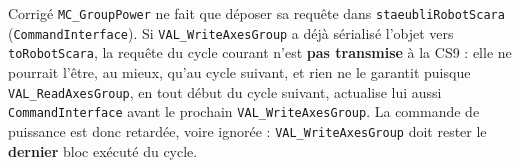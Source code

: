 \begin{UPSTIactivite}

\begin{UPSTIcorrectionP}{Corrigé}
\texttt{MC\_GroupPower} ne fait que déposer sa requête dans
\texttt{staeubliRobotScara} (\texttt{CommandInterface}). Si
\texttt{VAL\_WriteAxesGroup} a déjà sérialisé l'objet vers
\texttt{toRobotScara}, la requête du cycle courant n'est \textbf{pas
transmise} à la CS9 : elle ne pourrait l'être, au mieux, qu'au cycle
suivant, et rien ne le garantit puisque \texttt{VAL\_ReadAxesGroup}, en
tout début du cycle suivant, actualise lui aussi \texttt{CommandInterface}
avant le prochain \texttt{VAL\_WriteAxesGroup}. La commande de puissance
est donc retardée, voire ignorée : \texttt{VAL\_WriteAxesGroup} doit
rester le \textbf{dernier} bloc exécuté du cycle.
\end{UPSTIcorrectionP}
\end{UPSTIactivite}

